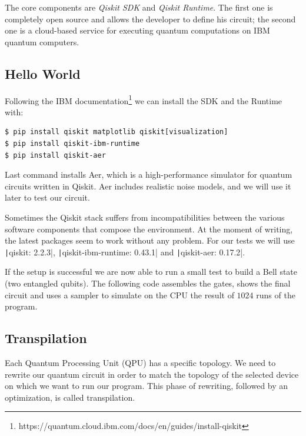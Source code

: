 The core components are \emph{Qiskit SDK} and \emph{Qiskit Runtime}. The first one is completely open source and allows the developer to define his circuit; the second one is a cloud-based service for executing quantum computations on IBM quantum computers.

\subsection{Hello World}
Following the IBM documentation\footnote{https://quantum.cloud.ibm.com/docs/en/guides/install-qiskit} we can install the SDK and the Runtime with:
\begin{center}
	\vspace{-.1cm}
	\begin{minipage}{.8\linewidth}
		\begin{verbatim}
$ pip install qiskit matplotlib qiskit[visualization]
$ pip install qiskit-ibm-runtime
$ pip install qiskit-aer
		\end{verbatim}
	\end{minipage}
\end{center}

Last command installs Aer, which is a high-performance simulator for quantum circuits written in Qiskit. Aer includes realistic noise models, and we will use it later to test our circuit.

Sometimes the Qiskit stack suffers from incompatibilities between the various software components that compose the environment. At the moment of writing, the latest packages seem to work without any problem. For our tests we will use \texttt|qiskit: 2.2.3|, \texttt|qiskit-ibm-runtime: 0.43.1| and \texttt|qiskit-aer: 0.17.2|.

If the setup is successful we are now able to run a small test to build a Bell state (two entangled qubits). The following code assembles the gates, shows the final circuit and uses a sampler to simulate on the CPU the result of $1024$ runs of the program.

\begin{listing}[h]
	\caption{Building Bell state}
	\label{lst:hello_qiskit}
\end{listing}

\subsection{Transpilation}
\label{sec:transpilation}
Each Quantum Processing Unit (QPU) has a specific topology. We need to rewrite our quantum circuit in order to match the topology of the selected device on which we want to run our program. This phase of rewriting, followed by an optimization, is called transpilation.


